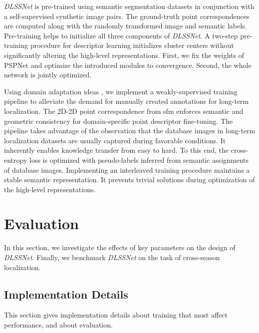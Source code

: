 {\em DLSSNet} is pre-trained using semantic segmentation datasets in conjunction with a self-supervised synthetic image pairs. 
The ground-truth point correspondences are computed along with the randomly transformed image and semantic labels.
Pre-training helps to initialize all three components of {\em DLSSNet}. 
A two-step pre-training procedure for descriptor learning initializes cluster centers without significantly altering the high-level representations. 
First, we fix the weights of PSPNet and optimize the introduced modules to convergence. 
Second, the whole network is jointly optimized.

Using domain adaptation ideas \cite{larsson2019cross}, we implement a weakly-supervised training pipeline to alleviate the demand for manually created annotations for long-term localization.  
The 2D-2D point correspondence from \acrshort{sfm} enforces semantic and geometric consistency for domain-specific point descriptor fine-tuning.
The pipeline takes advantage of the observation that the database images in long-term localization datasets are usually captured during
favorable conditions.
It inherently enables knowledge transfer from easy to hard.  
To this end, the cross-entropy loss is optimized with pseudo-labels inferred from semantic assignments of database images.  
Implementing an interleaved training procedure maintains a stable semantic representation.  
It prevents trivial solutions during optimization of the high-level representations\cite{larsson2019cross}.  

\section{Evaluation}
In this section, we investigate the effects of key parameters on the design of {\em DLSSNet}.
Finally, we benchmark {\em DLSSNet} on the task of cross-season localization. 


\subsection{Implementation Details}
This section gives implementation details about training that most affect performance, and about evaluation.

